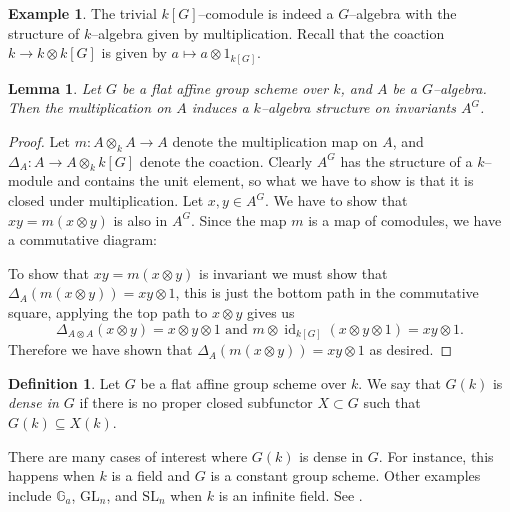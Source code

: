 \documentclass{article}
\theoremstyle{plain}
\newtheorem{Lemma}[Th]{Lemma}
\theoremstyle{definition}
\newtheorem{Def}[Th]{Definition}
\newtheorem{Ex}[Th]{Example}
\DeclareMathOperator{\id}{id}
\newcommand{\GL}{\mathrm{GL}}
\begin{document}
\begin{Ex}
    The trivial $k[G]$--comodule is indeed a $G$--algebra with the structure of $k$--algebra given by multiplication. Recall that the  coaction  $k\to k\otimes k[G]$ is given by $a\mapsto a\otimes 1_{k[G]}$.  
\end{Ex}

\begin{Lemma}\label{AG is a k-algebra}
    Let $G$ be a flat affine group scheme over $k$, and $A$ be a $G$--algebra.  Then the multiplication on $A$ induces a $k$--algebra structure on invariants $A^G$.
\end{Lemma}

\begin{proof}
    Let $m \colon A\otimes_k A\to A$ denote the multiplication map on $A$, and $\Delta_A\colon A\to A\otimes_k k[G]$ denote the coaction. Clearly $A^G$ has the structure of a $k$--module and contains the unit element, so what we have to show is that it is closed under multiplication. Let $x, y \in A^G$. We have to show that $xy=m(x\otimes y)$ is also in $A^G$. Since the map $m$ is a map of comodules, we have a commutative diagram:
    \begin{center}
    \end{center}
    To show that $xy=m(x\otimes y)$ is invariant we must show that $\Delta_A(m(x\otimes y))=xy\otimes 1$, this is just the bottom path in the commutative square, applying the top path to $x\otimes y$ gives us 
    \[
    \Delta_{A\otimes A}(x\otimes y)=x\otimes y\otimes 1 \mbox{  and  } m\otimes \id_{k[G]}(x\otimes y\otimes 1)=xy\otimes 1.
    \]
      Therefore we have shown that $\Delta_A(m(x\otimes y))=xy\otimes 1$ as desired.
\end{proof}

\begin{Def}
    Let $G$ be a flat affine group scheme over $k$. We say that $G(k)$ is \textit{dense in $G$} if there is no proper closed subfunctor $X\subset G$ such that $G(k)\subseteq X(k)$. 
\end{Def}

There are many cases of interest where $G(k)$ is dense in $G$. For instance, this happens when $k$ is a field and $G$ is a constant group scheme. Other examples include $\mathbb{G}_a$, $\GL_n$, and $\mathrm{SL}_n$ when $k$ is an infinite field. See \cite[Section 4.5]{Wat79}.
\end{document}
